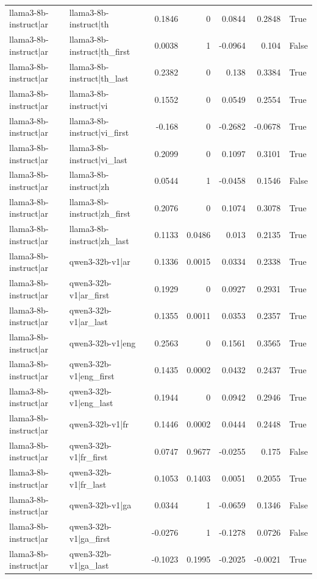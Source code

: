 \begin{table}
\begin{tabular}{l l r r r r l}
llama3-8b-instruct|ar & llama3-8b-instruct|th & 0.1846 & 0 & 0.0844 & 0.2848 & True \\
llama3-8b-instruct|ar & llama3-8b-instruct|th_first & 0.0038 & 1 & -0.0964 & 0.104 & False \\
llama3-8b-instruct|ar & llama3-8b-instruct|th_last & 0.2382 & 0 & 0.138 & 0.3384 & True \\
llama3-8b-instruct|ar & llama3-8b-instruct|vi & 0.1552 & 0 & 0.0549 & 0.2554 & True \\
llama3-8b-instruct|ar & llama3-8b-instruct|vi_first & -0.168 & 0 & -0.2682 & -0.0678 & True \\
llama3-8b-instruct|ar & llama3-8b-instruct|vi_last & 0.2099 & 0 & 0.1097 & 0.3101 & True \\
llama3-8b-instruct|ar & llama3-8b-instruct|zh & 0.0544 & 1 & -0.0458 & 0.1546 & False \\
llama3-8b-instruct|ar & llama3-8b-instruct|zh_first & 0.2076 & 0 & 0.1074 & 0.3078 & True \\
llama3-8b-instruct|ar & llama3-8b-instruct|zh_last & 0.1133 & 0.0486 & 0.013 & 0.2135 & True \\
llama3-8b-instruct|ar & qwen3-32b-v1|ar & 0.1336 & 0.0015 & 0.0334 & 0.2338 & True \\
llama3-8b-instruct|ar & qwen3-32b-v1|ar_first & 0.1929 & 0 & 0.0927 & 0.2931 & True \\
llama3-8b-instruct|ar & qwen3-32b-v1|ar_last & 0.1355 & 0.0011 & 0.0353 & 0.2357 & True \\
llama3-8b-instruct|ar & qwen3-32b-v1|eng & 0.2563 & 0 & 0.1561 & 0.3565 & True \\
llama3-8b-instruct|ar & qwen3-32b-v1|eng_first & 0.1435 & 0.0002 & 0.0432 & 0.2437 & True \\
llama3-8b-instruct|ar & qwen3-32b-v1|eng_last & 0.1944 & 0 & 0.0942 & 0.2946 & True \\
llama3-8b-instruct|ar & qwen3-32b-v1|fr & 0.1446 & 0.0002 & 0.0444 & 0.2448 & True \\
llama3-8b-instruct|ar & qwen3-32b-v1|fr_first & 0.0747 & 0.9677 & -0.0255 & 0.175 & False \\
llama3-8b-instruct|ar & qwen3-32b-v1|fr_last & 0.1053 & 0.1403 & 0.0051 & 0.2055 & True \\
llama3-8b-instruct|ar & qwen3-32b-v1|ga & 0.0344 & 1 & -0.0659 & 0.1346 & False \\
llama3-8b-instruct|ar & qwen3-32b-v1|ga_first & -0.0276 & 1 & -0.1278 & 0.0726 & False \\
llama3-8b-instruct|ar & qwen3-32b-v1|ga_last & -0.1023 & 0.1995 & -0.2025 & -0.0021 & True \\

\end{tabular}
\end{table}
